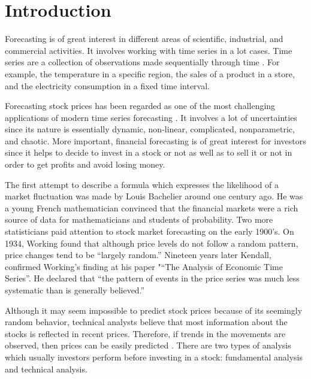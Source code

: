 \chapter{Introduction}
\label{ch:introsm}


Forecasting is of great interest in different areas of scientific, industrial, and commercial activities. It involves working with time series in a lot cases. Time series are a collection of observations made sequentially through time \cite{chatfield2000time}. For example, the temperature in a specific region, the sales of a product in a store, and the electricity consumption in a fixed time interval.

Forecasting stock prices has been regarded as one of the most challenging applications of modern time series forecasting \cite{pai2005hybrid}. It involves a lot of uncertainties since its nature is essentially dynamic, non-linear, complicated, nonparametric, and chaotic. More important, financial forecasting is of great interest for investors since it helps to decide to invest in a stock or not as well as to sell it or not in order to get profits and avoid losing money.

The first attempt to describe a formula which expresses the likelihood of a market fluctuation was made by Louis Bachelier around one century ago. He was a young French mathematician convinced that the financial markets were a rich source of data for mathematicians and students of probability. Two more statisticians paid attention to stock market forecasting on the early 1900's. On 1934, Working found that although price levels do not follow a random pattern, price changes tend to be “largely random.” Nineteen years later Kendall, confirmed Working's finding at his paper "“The Analysis of Economic Time Series”. He declared that “the pattern of events in the price series was much less systematic than is generally believed.” 

Although it may seem impossible to predict stock prices because of its seemingly random behavior, technical analysts believe that most information about the stocks is reflected in recent prices. Therefore, if trends in the movements are observed, then prices can be easily predicted \cite{patel2015predicting}. There are two types of analysis which usually investors perform before investing in a stock: fundamental analysis and technical analysis.


